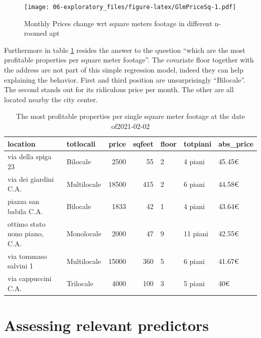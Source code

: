 \documentclass[
  12pt,
  a4paper,
  oneside]{book}
\theoremstyle{definition}
\theoremstyle{definition}
\theoremstyle{definition}
\theoremstyle{remark}
\begin{document}
\begin{figure}
\centering
\texttt{[image: 06-exploratory\_files/figure-latex/GlmPriceSq-1.pdf]}
\caption{\label{fig:GlmPriceSq}Monthly Prices change wrt square meters footage in different n-roomed apt}
\end{figure}

Furthermore in table \ref{tab:TopAbsPrice} resides the answer to the question ``which are the most profitable properties per square meter footage''. The covariate floor together with the address are not part of this simple regression model, indeed they can help explaining the behavior. First and third position are unsurprisingly ``Bilocale''. The second stands out for its ridiculous price per month. The other are all located nearby the city center.

\begin{table}

\caption{\label{tab:TopAbsPrice}The most profitable properties per single square meter footage at the date of2021-02-02}
\centering
\begin{tabular}[t]{llrrlll}
\toprule
location & totlocali & price & sqfeet & floor & totpiani & abs\_price\\
\midrule
via della spiga 23 & Bilocale & 2500 & 55 & 2 & 4 piani & 45.45€\\
via dei giardini C.A. & Multilocale & 18500 & 415 & 2 & 6 piani & 44.58€\\
piazza san babila C.A. & Bilocale & 1833 & 42 & 1 & 4 piani & 43.64€\\
ottimo stato nono piano, C.A. & Monolocale & 2000 & 47 & 9 & 11 piani & 42.55€\\
via tommaso salvini 1 & Multilocale & 15000 & 360 & 5 & 6 piani & 41.67€\\
\addlinespace
via cappuccini C.A. & Trilocale & 4000 & 100 & 3 & 5 piani & 40€\\
\bottomrule
\end{tabular}
\end{table}

\hypertarget{assessing-relevant-predictors}{%
\section{Assessing relevant predictors}\label{assessing-relevant-predictors}}
\end{document}
